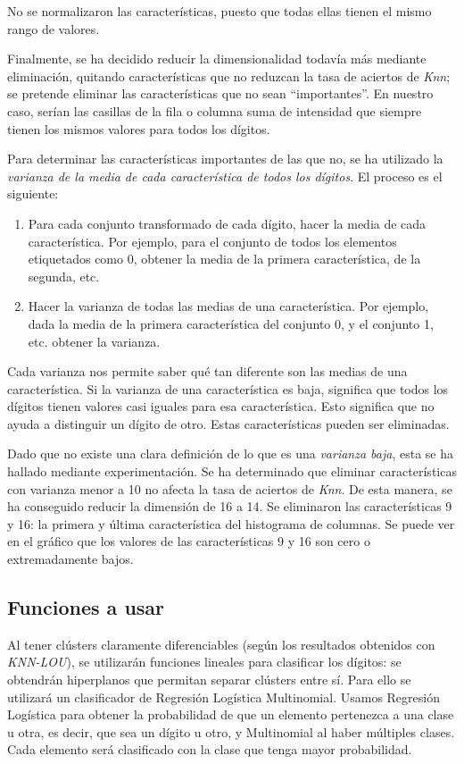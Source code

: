 \documentclass[12pt,spanish]{article} %
\begin{document}
No se normalizaron las características, puesto que todas ellas tienen el mismo rango de valores.

Finalmente, se ha decidido reducir la dimensionalidad todavía más mediante eliminación, quitando características que no reduzcan la tasa de aciertos de \textit{Knn}; se pretende eliminar las características que no sean ``importantes''. En nuestro caso, serían las casillas de la fila o columna suma de intensidad que siempre tienen los mismos valores para todos los dígitos.

Para determinar las características importantes de las que no, se ha utilizado la \textit{varianza de la media de cada característica de todos los dígitos}. El proceso es el siguiente:

\begin{enumerate}
\item Para cada conjunto transformado de cada dígito, hacer la media de cada característica. Por ejemplo, para el conjunto de todos los elementos etiquetados como 0, obtener la media de la primera característica, de la segunda, etc.
\item Hacer la varianza de todas las medias de una característica. Por ejemplo, dada la media de la primera característica del conjunto 0, y el conjunto 1, etc. obtener la varianza.
\end{enumerate}

Cada varianza nos permite saber qué tan diferente son las medias de una característica. Si la varianza de una característica es baja, significa que todos los dígitos tienen valores casi iguales para esa característica. Esto significa que no ayuda a distinguir un dígito de otro. Estas características pueden ser eliminadas.

Dado que no existe una clara definición de lo que es una \textit{varianza baja}, esta se ha hallado mediante experimentación. Se ha determinado que eliminar características con varianza menor a 10 no afecta la tasa de aciertos de \textit{Knn}. De esta manera, se ha conseguido reducir la dimensión de 16 a 14. Se eliminaron las características 9 y 16: la primera y última característica del histograma de columnas. Se puede ver en el gráfico que los valores de las características 9 y 16 son cero o extremadamente bajos.

\subsection{Funciones a usar}

Al tener clústers claramente diferenciables (según los resultados obtenidos con \textit{KNN-LOU}), se utilizarán funciones lineales para clasificar los dígitos: se obtendrán hiperplanos que permitan separar clústers entre sí. Para ello se utilizará un clasificador de Regresión Logística Multinomial. Usamos Regresión Logística para obtener la probabilidad de que un elemento pertenezca a una clase u otra, es decir, que sea un dígito u otro, y Multinomial al haber múltiples clases. Cada elemento será clasificado con la clase que tenga mayor probabilidad.
\end{document}
